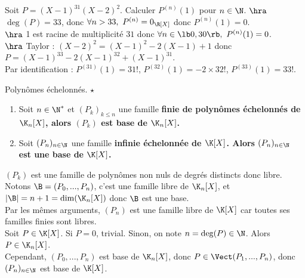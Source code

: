 \documentclass[11pt]{article}
\begin{document}
\vspace*{-0.7cm}

\begin{ex}{}{}
    Soit $P=(X-1)^{31}(X-2)^2$. Calculer $P^{(n)}(1)$ pour $n\in\N$.
    \tcblower
    $\hra$ $\deg(P)=33$, donc $\forall n > 33, ~ P^{(n)}=0_{\R[X]}$ donc $P^{(n)}(1)=0$.\\
    $\hra$ 1 est racine de multiplicité $31$ donc $\forall n \in \lb0,30\rb, ~ P^{(n)}(1)=0$.\\
    $\hra$ Taylor : $(X-2)^2=(X-1)^2-2(X-1)+1$ donc $P=(X-1)^{33}-2(X-1)^{32}+(X-1)^{31}$.\\
    Par identification : $P^{(31)}(1)=31!$, $P^{(32)}(1)=-2\times32!$, $P^{(33)}(1)=33!$.
\end{ex}

\vspace*{-0.7cm}

\begin{prop}{Polynômes échelonnés. $\star$}{}
    \begin{enumerate}
        \item Soit $n\in\N^*$ et $(P_k)_{k\leq n}$ une famille \bf{finie} de polynômes échelonnés de $\K_n[X]$, alors $(P_k)$ est base de $\K_n[X]$.
        \item Soit $(P_n)_{n\in\N}$ une famille \bf{infinie} échelonnée de $\K[X]$. Alors $(P_n)_{n\in\N}$ est une base de $\K[X]$.
    \end{enumerate}
    \tcblower
     $(P_k)$ est une famille de polynômes non nuls de degrés distincts donc libre.\\
    Notons $\B=(P_0,...,P_n)$, c'est une famille libre de $\K_n[X]$, et $|\B|=n+1=\dim(\K_n[X])$ donc $\B$ est une base.\\
     Par les mêmes arguments, $(P_n)$ est une famille libre de $\K[X]$ car toutes ses familles finies sont libres.\\
    Soit $P\in\K[X]$. Si $P=0$, trivial. Sinon, on note $n=\deg(P)\in\N$. Alors $P\in\K_n[X]$.\\
    Cependant, $(P_0,...,P_n)$ est base de $\K_n[X]$, donc $P\in\Vect(P_1,...,P_n)$, donc $(P_n)_{n\in\N}$ est base de $\K[X]$.
\end{prop}

\vspace*{-0.8cm}
\end{document}
